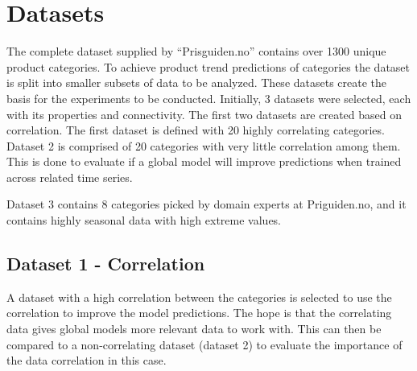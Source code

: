\section{Datasets}
\label{section:Data:Dataset}

The complete dataset supplied by ``Prisguiden.no'' contains over 1300 unique product categories.
To achieve product trend predictions of categories the dataset is split into smaller subsets of data to be analyzed.
These datasets create the basis for the experiments to be conducted.
Initially, 3 datasets were selected, each with its properties and connectivity.
The first two datasets are created based on correlation.
The first dataset is defined with 20 highly correlating categories.
Dataset 2 is comprised of 20 categories with very little correlation among them.
This is done to evaluate if a global model will improve
predictions when trained across related time series.

Dataset 3 contains 8 categories picked by domain experts at Priguiden.no, and it contains highly seasonal data with high extreme values.


\subsection{Dataset 1 - Correlation}

A dataset with a high correlation between the categories is selected to use the correlation to improve the model predictions.
The hope is that the correlating data gives global models more relevant data to work with.
This can then be compared to a non-correlating dataset (dataset 2) to evaluate the importance of the data correlation in this case.

